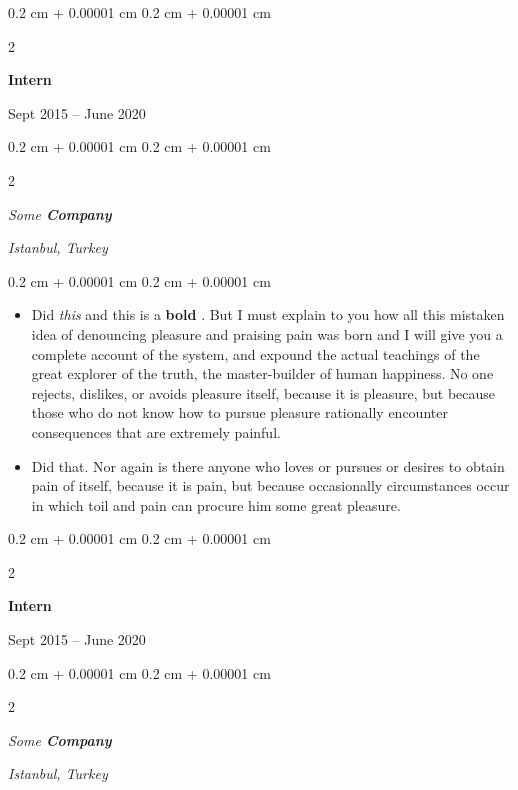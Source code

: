 \documentclass[10pt, letterpaper]{article}
\newenvironment{highlights}{
    \begin{itemize}[
        topsep=0.10 cm,
        parsep=0.10 cm,
        partopsep=0pt,
        itemsep=0pt,
        leftmargin=0.4 cm + 10pt
    ]
}{
    \end{itemize}
} %
\newenvironment{onecolentry}{
    \begin{adjustwidth}{
        0.2 cm + 0.00001 cm
    }{
        0.2 cm + 0.00001 cm
    }
}{
    \end{adjustwidth}
} %
\newenvironment{twocolentry}[2][]{
    \onecolentry
    \def\secondColumn{#2}
    \setcolumnwidth{\fill, 4.5 cm}
    \begin{paracol}{2}
}{
    \switchcolumn \raggedleft \secondColumn
    \end{paracol}
    \endonecolentry
} %
\let\hrefWithoutArrow\href
\renewcommand{\href}[2]{\hrefWithoutArrow{#1}{\ifthenelse{\equal{#2}{}}{ }{#2 }\raisebox{.15ex}{\footnotesize \faExternalLink*}}}
\begin{document}
                \begin{twocolentry}{
                    Sept 2015 – June 2020
                }
                \textbf{Intern}
                \end{twocolentry}
            \begin{twocolentry}{
        \textit{Istanbul, Turkey}    }
            \textit{Some \textbf{Company}}
            \end{twocolentry}

        \vspace{0.10 cm}
        \begin{onecolentry}
            \begin{highlights}
                \item Did \textit{this} and this is a \textbf{bold} \href{https://example.com}{link}. But I must explain to you how all this mistaken idea of denouncing pleasure and praising pain was born and I will give you a complete account of the system, and expound the actual teachings of the great explorer of the truth, the master-builder of human happiness. No one rejects, dislikes, or avoids pleasure itself, because it is pleasure, but because those who do not know how to pursue pleasure rationally encounter consequences that are extremely painful.
                \item Did that. Nor again is there anyone who loves or pursues or desires to obtain pain of itself, because it is pain, but because occasionally circumstances occur in which toil and pain can procure him some great pleasure.
            \end{highlights}
        \end{onecolentry}


        \vspace{0.2 cm}

                \begin{twocolentry}{
                    Sept 2015 – June 2020
                }
                \textbf{Intern}
                \end{twocolentry}
            \begin{twocolentry}{
        \textit{Istanbul, Turkey}    }
            \textit{Some \textbf{Company}}
            \end{twocolentry}
\end{document}
